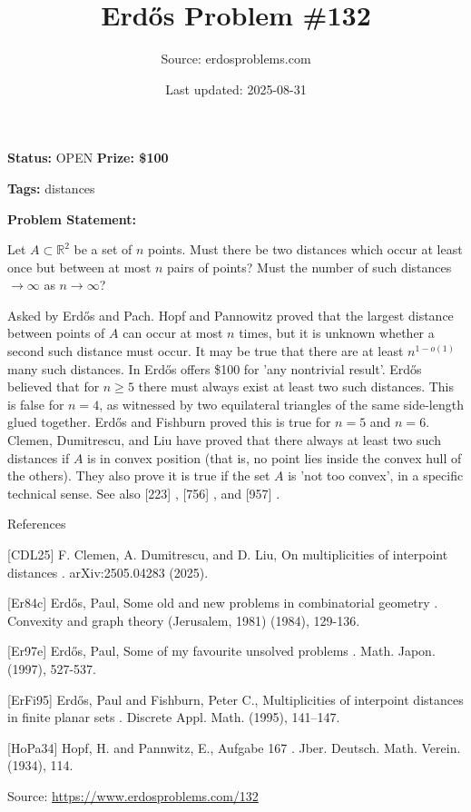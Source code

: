 \documentclass{article}
\title{Erd\H{o}s Problem \#132}
\date{Last updated: 2025-08-31}
\author{Source: erdosproblems.com}
\begin{document}
\maketitle

\noindent\textbf{Status:} OPEN \quad \textbf{Prize: \$100}

\noindent\textbf{Tags:} distances

\medskip

\noindent\textbf{Problem Statement:}

Let $A\subset \mathbb{R}^2$ be a set of $n$ points. Must there be two distances which occur at least once but between at most $n$ pairs of points? Must the number of such distances $\to \infty$ as $n\to \infty$?




Asked by Erd\H{o}s and Pach. Hopf and Pannowitz \cite{HoPa34} proved that the largest distance between points of $A$ can occur at most $n$ times, but it is unknown whether a second such distance must occur. It may be true that there are at least $n^{1-o(1)}$ many such distances. In \cite{Er97e} Erd\H{o}s offers \$100 for 'any nontrivial result'. Erd\H{o}s \cite{Er84c} believed that for $n\geq 5$ there must always exist at least two such distances. This is false for $n=4$, as witnessed by two equilateral triangles of the same side-length glued together. Erd\H{o}s and Fishburn \cite{ErFi95} proved this is true for $n=5$ and $n=6$. Clemen, Dumitrescu, and Liu \cite{CDL25} have proved that there always at least two such distances if $A$ is in convex position (that is, no point lies inside the convex hull of the others). They also prove it is true if the set $A$ is 'not too convex', in a specific technical sense. See also [223] , [756] , and [957] .




References

[CDL25] F. Clemen, A. Dumitrescu, and D. Liu, On multiplicities of interpoint distances . arXiv:2505.04283 (2025).

[Er84c] Erd\H{o}s, Paul, Some old and new problems in combinatorial geometry . Convexity and graph theory (Jerusalem, 1981) (1984), 129-136.

[Er97e] Erd\H{o}s, Paul, Some of my favourite unsolved problems . Math. Japon. (1997), 527-537.

[ErFi95] Erd\H{o}s, Paul and Fishburn, Peter C., Multiplicities of interpoint distances in finite planar sets . Discrete Appl. Math. (1995), 141--147.

[HoPa34] Hopf, H. and Pannwitz, E., Aufgabe 167 . Jber. Deutsch. Math. Verein. (1934), 114.


\bigskip
\noindent\small{Source: \url{https://www.erdosproblems.com/132}}
\end{document}
